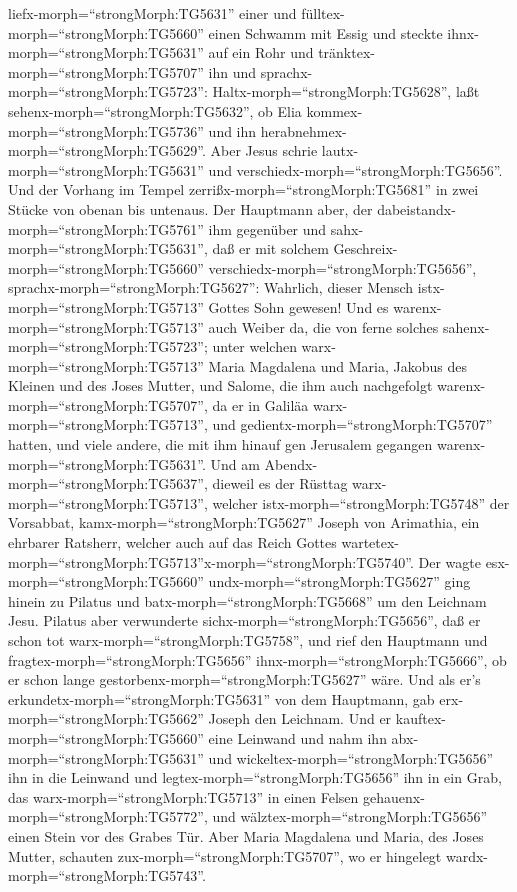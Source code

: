 liefx-morph=``strongMorph:TG5631'' einer und
fülltex-morph=``strongMorph:TG5660'' einen Schwamm mit Essig und steckte
ihnx-morph=``strongMorph:TG5631'' auf ein Rohr und
tränktex-morph=``strongMorph:TG5707'' ihn und
sprachx-morph=``strongMorph:TG5723'':
Haltx-morph=``strongMorph:TG5628'', laßt
sehenx-morph=``strongMorph:TG5632'', ob Elia
kommex-morph=``strongMorph:TG5736'' und ihn
herabnehmex-morph=``strongMorph:TG5629''.  Aber Jesus
schrie lautx-morph=``strongMorph:TG5631'' und
verschiedx-morph=``strongMorph:TG5656''.  Und der Vorhang
im Tempel zerrißx-morph=``strongMorph:TG5681'' in zwei Stücke von obenan
bis untenaus.  Der Hauptmann aber, der
dabeistandx-morph=``strongMorph:TG5761'' ihm gegenüber und
sahx-morph=``strongMorph:TG5631'', daß er mit solchem
Geschreix-morph=``strongMorph:TG5660''
verschiedx-morph=``strongMorph:TG5656'',
sprachx-morph=``strongMorph:TG5627'': Wahrlich, dieser Mensch
istx-morph=``strongMorph:TG5713'' Gottes Sohn gewesen!  Und
es warenx-morph=``strongMorph:TG5713'' auch Weiber da, die von ferne
solches sahenx-morph=``strongMorph:TG5723''; unter welchen
warx-morph=``strongMorph:TG5713'' Maria Magdalena und Maria, Jakobus des
Kleinen und des Joses Mutter, und Salome,  die ihm auch
nachgefolgt warenx-morph=``strongMorph:TG5707'', da er in Galiläa
warx-morph=``strongMorph:TG5713'', und
gedientx-morph=``strongMorph:TG5707'' hatten, und viele andere, die mit
ihm hinauf gen Jerusalem gegangen warenx-morph=``strongMorph:TG5631''.
 Und am Abendx-morph=``strongMorph:TG5637'', dieweil es der
Rüsttag warx-morph=``strongMorph:TG5713'', welcher
istx-morph=``strongMorph:TG5748'' der Vorsabbat, 
kamx-morph=``strongMorph:TG5627'' Joseph von Arimathia, ein ehrbarer
Ratsherr, welcher auch auf das Reich Gottes
wartetex-morph=``strongMorph:TG5713''x-morph=``strongMorph:TG5740''. Der
wagte esx-morph=``strongMorph:TG5660'' undx-morph=``strongMorph:TG5627''
ging hinein zu Pilatus und batx-morph=``strongMorph:TG5668'' um den
Leichnam Jesu.  Pilatus aber verwunderte
sichx-morph=``strongMorph:TG5656'', daß er schon tot
warx-morph=``strongMorph:TG5758'', und rief den Hauptmann und
fragtex-morph=``strongMorph:TG5656'' ihnx-morph=``strongMorph:TG5666'',
ob er schon lange gestorbenx-morph=``strongMorph:TG5627'' wäre.
 Und als er's erkundetx-morph=``strongMorph:TG5631'' von
dem Hauptmann, gab erx-morph=``strongMorph:TG5662'' Joseph den Leichnam.
 Und er kauftex-morph=``strongMorph:TG5660'' eine Leinwand
und nahm ihn abx-morph=``strongMorph:TG5631'' und
wickeltex-morph=``strongMorph:TG5656'' ihn in die Leinwand und
legtex-morph=``strongMorph:TG5656'' ihn in ein Grab, das
warx-morph=``strongMorph:TG5713'' in einen Felsen
gehauenx-morph=``strongMorph:TG5772'', und
wälztex-morph=``strongMorph:TG5656'' einen Stein vor des Grabes Tür.
 Aber Maria Magdalena und Maria, des Joses Mutter, schauten
zux-morph=``strongMorph:TG5707'', wo er hingelegt
wardx-morph=``strongMorph:TG5743''.

